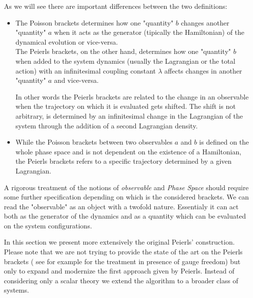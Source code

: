 \documentclass[Main]{subfiles}
\begin{document}
		As we will see there are important differences between the two definitions:
		\begin{itemize}
			\item The Poisson brackets determines how one "quantity" $b$ changes another "quantity" $a$ when it acts as the  generator (tipically the  Hamiltonian) of the dynamical evolution or vice-versa. \cite{Sharan2010}
	\\	
	The Peierls brackets, on the other hand, determines how one "quantity" $b$  when added to the system dynamics (usually the Lagrangian or the total action)  with an infinitesimal coupling constant $\lambda$ affects changes in another "quantity" $a$ and vice-versa.
	
	In other words the Peierls brackets are related to the change in an observable when the trajectory on which it is evaluated gets shifted.
	The shift is not arbitrary, is determined by an infinitesimal change in the Lagrangian of the system through the addition of a second Lagrangian density.
	
			\item While the Poisson brackets between two observables $a$ and $b$ is defined on the whole phase space and is not dependent on the existence of a Hamiltonian, the Peierls brackets refers to a specific trajectory determined by a given Lagrangian. 
		\end{itemize}
		A rigorous treatment of the notions of \emph{observable} and \emph{Phase Space} should require some further specification depending on which is the  considered brackets.		
		We can read the "observable" as an object with a twofold nature. Essentialy it can act both as the generator of the dynamics and as a quantity which can be evaluated on the system configurations.

		\vspace{2mm}	
		In this section we present more extensively the original Peierls' construction. 
		Please note that we are not trying to provide the state of the art on the Peierls brackets ( see for example \cite{Khavkine2014} for the treatment in presence of gauge freedom) but only to expand and modernize the first approach given by Peierls.
	Instead of considering only a scalar theory we extend the algorithm to a broader class of systems.
	
\end{document}
